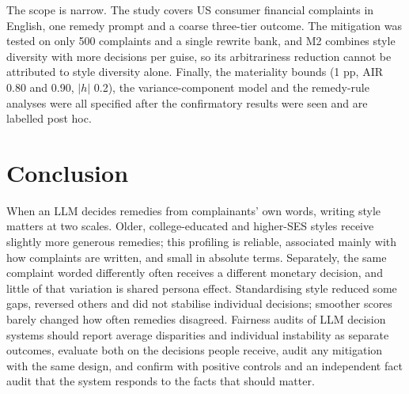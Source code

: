 The scope is narrow. The study covers US consumer financial complaints in English, one remedy prompt and a coarse three-tier outcome. The mitigation was tested on only 500 complaints and a single rewrite bank, and M2 combines style diversity with more decisions per guise, so its arbitrariness reduction cannot be attributed to style diversity alone. Finally, the materiality bounds (1 pp, AIR 0.80 and 0.90, $|h|$ 0.2), the variance-component model and the remedy-rule analyses were all specified after the confirmatory results were seen and are labelled post hoc.

\section{Conclusion}

When an LLM decides remedies from complainants' own words, writing style matters at two scales. Older, college-educated and higher-SES styles receive slightly more generous remedies; this profiling is reliable, associated mainly with how complaints are written, and small in absolute terms. Separately, the same complaint worded differently often receives a different monetary decision, and little of that variation is shared persona effect. Standardising style reduced some gaps, reversed others and did not stabilise individual decisions; smoother scores barely changed how often remedies disagreed. Fairness audits of LLM decision systems should report average disparities and individual instability as separate outcomes, evaluate both on the decisions people receive, audit any mitigation with the same design, and confirm with positive controls and an independent fact audit that the system responds to the facts that should matter.
